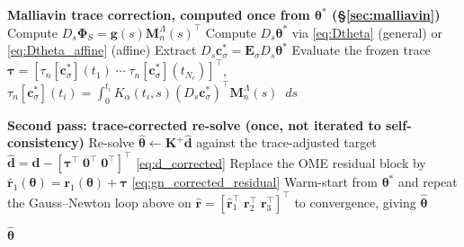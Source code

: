 \documentclass[11pt]{article}
\newcommand{\dd}{\mathop{}\!d}
\begin{document}
\begin{algorithm}[t]
\begin{algorithmic}[1]
\Statex \textbf{Malliavin trace correction, computed once from $\boldsymbol \theta^*$ (\S\ref{sec:malliavin})}
\State Compute $D_s \boldsymbol \Phi_S = \mathbf g(s) \mathbf M_n^\Lambda(s)^\top$ 
\State Compute $D_s \boldsymbol \theta^*$ via \eqref{eq:Dtheta} (general) or \eqref{eq:Dtheta_affine} (affine)
\State Extract $D_s \mathbf c_\sigma^* = \mathbf E_\sigma D_s \boldsymbol \theta^*$
\State Evaluate the frozen trace $\boldsymbol \tau = [\tau_n[\mathbf c_\sigma^*](t_1) \; \cdots \; \tau_n[\mathbf c_\sigma^*](t_{N_c})]^\top$, $\tau_n[\mathbf c_\sigma^*](t_i) = \int_0^{t_i} K_\alpha(t_i, s) (D_s \mathbf c_\sigma^*)^\top \mathbf M_n^\Lambda(s) \dd{s}$

\Statex \textbf{Second pass: trace-corrected re-solve (once, not iterated to self-consistency)}
    \State Re-solve $\hat{\boldsymbol \theta} \gets \mathbf K^+ \hat{\mathbf d}$ against the trace-adjusted target $\hat{\mathbf d} = \mathbf d - [\boldsymbol \tau^\top \; \mathbf 0^\top \; \mathbf 0^\top]^\top$ \eqref{eq:d_corrected}
\Else
    \State Replace the OME residual block by $\hat{\mathbf r}_1(\boldsymbol \theta) = \mathbf r_1(\boldsymbol \theta) + \boldsymbol \tau$ \eqref{eq:gn_corrected_residual}
    \State Warm-start from $\boldsymbol \theta^*$ and repeat the Gauss--Newton loop above on $\hat{\mathbf r} = [\hat{\mathbf r}_1^\top \; \mathbf r_2^\top \; \mathbf r_3^\top]^\top$ to convergence, giving $\hat{\boldsymbol \theta}$
\EndIf

\State \Return $\hat{\boldsymbol \theta}$
\end{algorithmic}
\end{algorithm}
\end{document}

